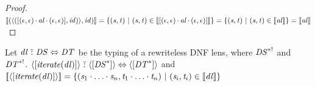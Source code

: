 \documentclass[acmsmall]{acmart}
\begin{document}
\begin{proof}
  $\SemanticsOf{(\DNFLensOf{(\SequenceLensOf{(\EmptyString,\EmptyString) \SeqLSep \AtomLens \SeqLSep (\EmptyString,\EmptyString)},\Identity)},\Identity)}
  =
  \SetOf{(\String,\StringAlt) \SuchThat (\String,\StringAlt) \in
    \SemanticsOf{\SequenceLensOf{(\EmptyString,\EmptyString) \SeqLSep \AtomLens \SeqLSep (\EmptyString,\EmptyString)}}}
  = \SetOf{(\String,\StringAlt) \SuchThat (\String,\StringAlt) \in
    \SemanticsOf{\AtomLens}}
  = \SemanticsOf{\AtomLens}$
\end{proof}

\begin{lemma}
  \label{lem:typ_sem_it}
  Let $\mathit{dl} \,\,\tilde{:}\,\, \mathit{DS} \Leftrightarrow \mathit{DT}$ be
  the typing of a rewriteless DNF lens, where
  $\mathit{DS}^{*!}$ and $\mathit{DT}^{*!}$.
  $\langle[\mathit{\mathit{iterate}(\mathit{dl})}]\rangle \,\,\tilde{:}\,\,
  \langle[{\mathit{DS}}^*]\rangle \Leftrightarrow
  \langle[{\mathit{DT}}^*]\rangle$ and
  $[ \! [\langle[\mathit{\mathit{iterate}(\mathit{dl})}]\rangle] \! ] =
  \{
    (\mathit{s}_1\cdot\ldots\cdot\mathit{s}_n,\mathit{t}_1\cdot\ldots\cdot\mathit{t}_n)
    ~|~
    (\mathit{s}_i,\mathit{t}_i)\in[ \! [\mathit{dl}] \! ]\}$
\end{lemma}
\end{document}
